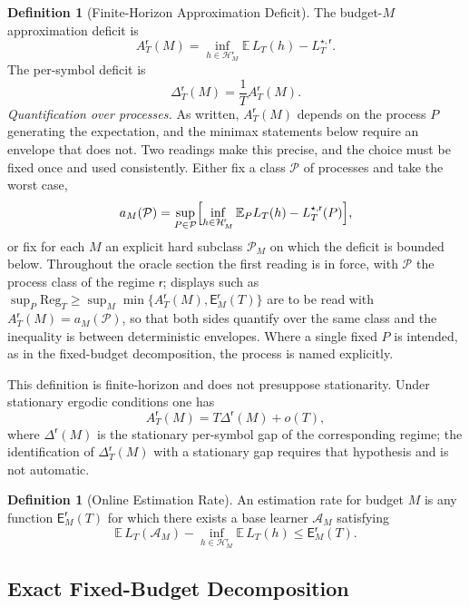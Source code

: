 \documentclass[12pt]{article}
\theoremstyle{definition}
\newtheorem{definition}[theorem]{Definition}
\newcommand{\Hcal}{\mathcal H}
\newcommand{\Reg}{\mathrm{Reg}}
\newcommand{\Est}{\mathsf E}
\newcommand{\Aapp}{A_T}
\begin{document}
\begin{definition}[Finite-Horizon Approximation Deficit]
\label{def:approx-deficit}
The budget-$M$ approximation deficit is
\[
\Aapp^{\mathsf r}(M)
=
\inf_{h\in\Hcal_M^{\mathsf r}}
\mathbb E\,L_T(h)
-
L_T^{\star,\mathsf r}.
\]
The per-symbol deficit is
\[
\Delta_T^{\mathsf r}(M)
=
\frac1T\Aapp^{\mathsf r}(M).
\]
\emph{Quantification over processes.}  As written, $\Aapp^{\mathsf r}(M)$
depends on the process $P$ generating the expectation, and the minimax
statements below require an envelope that does not.  Two readings make this
precise, and the choice must be fixed once and used consistently.  Either fix a
class $\mathcal P$ of processes and take the worst case,
\[
a_M(\mathcal P)
=
\sup_{P\in\mathcal P}
\Bigl[
\inf_{h\in\Hcal_M^{\mathsf r}}\mathbb E_P L_T(h)-L_T^{\star,\mathsf r}(P)
\Bigr],
\]
or fix for each $M$ an explicit hard subclass $\mathcal P_M$ on which the
deficit is bounded below.  Throughout the oracle section the first reading is
in force, with $\mathcal P$ the process class of the regime $\mathsf r$;
displays such as
$\sup_P\Reg_T\ge\sup_M\min\{\Aapp^{\mathsf r}(M),\Est_M^{\mathsf r}(T)\}$ are
to be read with $\Aapp^{\mathsf r}(M)=a_M(\mathcal P)$, so that both sides
quantify over the same class and the inequality is between deterministic
envelopes.  Where a single fixed $P$ is intended, as in the fixed-budget
decomposition, the process is named explicitly.

This definition is finite-horizon and does not presuppose stationarity.  Under
stationary ergodic conditions one has
\[
\Aapp^{\mathsf r}(M)
=
T\Delta^{\mathsf r}(M)+o(T),
\]
where $\Delta^{\mathsf r}(M)$ is the stationary per-symbol gap of the
corresponding regime; the identification of $\Delta_T^{\mathsf r}(M)$ with a
stationary gap requires that hypothesis and is not automatic.
\end{definition}

\begin{definition}[Online Estimation Rate]
\label{def:estimation-rate}
An estimation rate for budget $M$ is any function $\Est_M^{\mathsf r}(T)$ for
which there exists a base learner $\mathcal A_M$ satisfying
\[
\mathbb E\,L_T(\mathcal A_M)
-
\inf_{h\in\Hcal_M^{\mathsf r}}
\mathbb E\,L_T(h)
\le
\Est_M^{\mathsf r}(T).
\]
\end{definition}

\subsection{Exact Fixed-Budget Decomposition}
\label{subsec:oracle-fixed}
\end{document}
